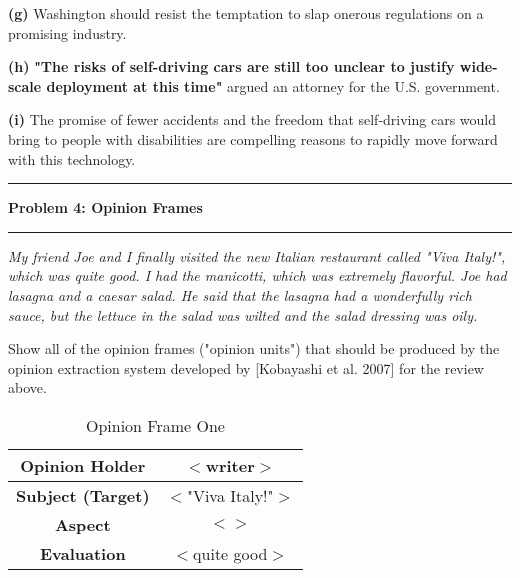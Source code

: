 \documentclass[11pt]{article}
\newcommand\question[2]{\vspace{.25in}\hrule\textbf{#1: #2}\vspace{.5em}\hrule\vspace{.10in}}
\renewcommand\part[1]{\vspace{.10in}\textbf{(#1)}}
\begin{document}

\part{g} Washington should resist the temptation to slap onerous regulations on a promising industry.


\part{h} \textbf{"The risks of self-driving cars are still too unclear to justify wide-scale deployment at this time"} argued an attorney for the U.S. government.


\part{i} The promise of fewer accidents and the freedom that self-driving cars would bring to people with disabilities are compelling reasons to rapidly move forward with this technology.


\question{Problem 4}{Opinion Frames}

\textit{My friend Joe and I finally visited the new Italian restaurant called "Viva Italy!", which was quite good. I had the manicotti, which was extremely flavorful. Joe had lasagna and a caesar salad. He said that the lasagna had a wonderfully rich sauce, but the lettuce in the salad was wilted and the salad dressing was oily.} \newline

Show all of the opinion frames ("opinion units") that should be produced by the opinion extraction system developed by [Kobayashi et al. 2007] for the review above.

 \begin{table}[H]
\centering
{\renewcommand{\arraystretch}{1.2}%
\begin{tabular}{| c | c |}
\hline
\textbf{Opinion Holder} & $<$writer$>$\\ \hline
\textbf{Subject (Target)} & $<$"Viva Italy!"$>$ \\ \hline
\textbf{Aspect} & $<$$>$ \\ \hline
\textbf{Evaluation} & $<$quite good$>$ \\ \hline
\end{tabular}}
\caption{Opinion Frame One}
\end{table}
\end{document}
